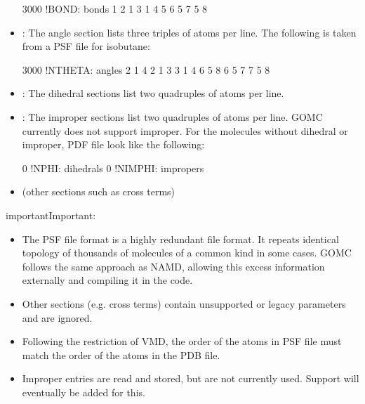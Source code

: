 \documentclass[letterpaper,10pt,english]{sphinxmanual}
\begin{document}
\begin{itemize}
\begin{sphinxVerbatim}[commandchars=\\\{\}]
3000   !BOND:     bonds
1   2   1   3   1   4   5   6
5   7   5   8
\end{sphinxVerbatim}

\item {} 
: The angle section lists three triples of atoms per line. The following is taken from a PSF file for isobutane:

\begin{sphinxVerbatim}[commandchars=\\\{\}]
3000   !NTHETA:   angles
2   1   4   2   1   3   3   1   4
6   5   8   6   5   7   7   5   8
\end{sphinxVerbatim}

\item {} 
: The dihedral sections list two quadruples of atoms per line.

\item {} 
: The improper sections list two quadruples of atoms per line. GOMC currently does not support improper. For the molecules without dihedral or improper, PDF file look like the following:

\begin{sphinxVerbatim}[commandchars=\\\{\}]
0   !NPHI: dihedrals
0   !NIMPHI: impropers
\end{sphinxVerbatim}

\item {} 
(other sections such as cross terms)

\end{itemize}

\begin{sphinxadmonition}{important}{Important:}\begin{itemize}
\item {} 
The PSF file format is a highly redundant file format. It repeats identical topology of thousands of molecules of a common kind in some cases. GOMC follows the same approach as NAMD, allowing this excess information externally and compiling it in the code.

\item {} 
Other sections (e.g. cross terms) contain unsupported or legacy parameters and are ignored.

\item {} 
Following the restriction of VMD, the order of the atoms in PSF file must match the order of the atoms in the PDB file.

\item {} 
Improper entries are read and stored, but are not currently used. Support will eventually be added for this.

\end{itemize}
\end{sphinxadmonition}
\end{document}
